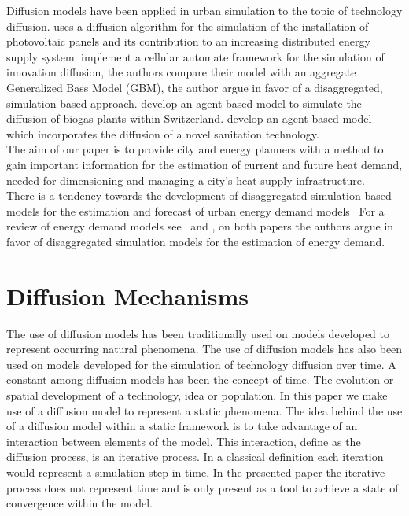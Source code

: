 Diffusion models have been applied in urban simulation to the topic of
technology diffusion.  uses a diffusion algorithm for the
simulation of the installation of photovoltaic panels and its contribution to
an increasing distributed energy supply system. 
implement a cellular automate framework for the simulation of innovation
diffusion, the authors compare their model with an aggregate Generalized Bass
Model (GBM), the author argue in favor of a disaggregated, simulation based
approach.
 develop an agent-based model to simulate the diffusion of
biogas plants within Switzerland.  develop an agent-based
model which incorporates the diffusion of a novel sanitation technology.\\

The aim of our paper is to provide city and energy planners with a method to
gain important information for the estimation of current and future heat
demand, needed for dimensioning and managing a city's  heat supply
infrastructure.\\ 

There is a tendency towards the development of disaggregated simulation based
models for the estimation and forecast of urban energy demand
models~\cite{Balaras.2007, Kavgic.2010, Dascalaki.2010, Dascalaki.2011,
DallO.2012, Caputo.2013, Hrabovszky.2013, Kragh.2013, Singh.2013}
%
For a review of energy demand models see~\citet{Swan.2009} and 
, on both papers the authors argue in favor of disaggregated
simulation models for the estimation of energy demand.\\
 

\section{Diffusion Mechanisms}

The use of diffusion models has been traditionally used on models developed to
represent occurring natural phenomena.
The use of diffusion models has also been used on models developed for the
simulation of technology diffusion over time. 
%
A constant among diffusion models has been the concept of time. The evolution
or spatial development of a technology, idea or population.
In this paper we make use of a diffusion model to represent a static phenomena.
The idea behind the use of a diffusion model within a static framework is to
take advantage of an interaction between elements of the model.
This interaction, define as the diffusion process, is an iterative process. In
a classical definition each iteration would represent a simulation step in
time.
In the presented paper the iterative process does not represent time and is
only present as a tool to achieve a state of convergence within the model.\\

